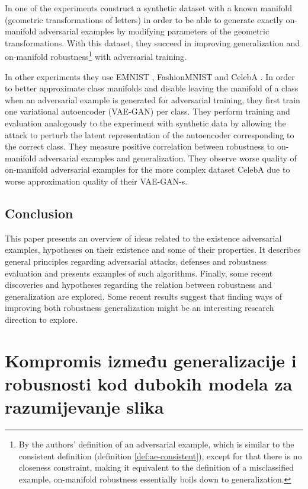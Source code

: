 \documentclass[oneside]{book}
\begin{document}
In one of the experiments \citet{Stutz:2018:DARG} construct a synthetic dataset with a known manifold (geometric transformations of letters) in order to be able to generate exactly on-manifold adversarial examples by modifying parameters of the geometric transformations. With this dataset, they succeed in improving generalization and on-manifold robustness\footnote{By the authors' definition of an adversarial example, which is similar to the consistent definition (definition \ref{def:ae-consistent}), except for that there is no closeness constraint, making it equivalent to the definition of a misclassified example, on-manifold robustness essentially boils down to generalization.} with adversarial training.

In other experiments they use EMNIST \citep{Cohen:2017:EMNIST}, FashionMNIST \citep{Xiao:2017:FMNIDBMLA} and CelebA \citep{Liu:2015:DLFAW}. In order to better approximate class manifolds and disable leaving the manifold of a class when an adversarial example is generated for adversarial training, they first train one variational autoencoder (VAE-GAN) per class. They perform training and evaluation analogously to the experiment with synthetic data by allowing the attack to perturb the latent representation of the autoencoder corresponding to the correct class. They measure positive correlation between robustness to on-manifold adversarial examples and generalization. They observe worse quality of on-manifold adversarial examples for the more complex dataset CelebA due to worse approximation quality of their VAE-GAN-s.


\section{Conclusion}

This paper presents an overview of ideas related to the existence adversarial examples, hypotheses on their existence and some of their properties. It describes general principles regarding adversarial attacks, defenses and robustness evaluation and presents examples of such algorithms. Finally, some recent discoveries and hypotheses regarding the relation between robustness and generalization are explored. Some recent results \citep{Stutz:2018:DARG} suggest that finding ways of improving both robustness generalization might be an interesting research direction to explore.




\chapter{Kompromis između generalizacije i robusnosti kod dubokih modela za razumijevanje slika}
\end{document}
